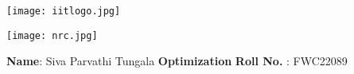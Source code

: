 \documentclass[10pt,a4paper]{report}
\begin{document}
\begin{figure*}[!tbp]
  \centering
  \begin{minipage}[b]{0.4\textwidth}
   \texttt{[image: iitlogo.jpg]} 
  \end{minipage}
  \hfill
  \vspace{5mm}\begin{minipage}[b]{0.4\textwidth}
\raggedleft \texttt{[image: nrc.jpg]} 
  \end{minipage}\vspace{0.2cm}
\end{figure*}
\raggedright \textbf{Name}:\hspace{1mm} Siva Parvathi Tungala\hspace{3cm} \Large \textbf{Optimization}\hspace{2.5cm} %
\normalsize \textbf{Roll No.} :\hspace{1mm} FWC22089\vspace{1cm}
\end{document}
